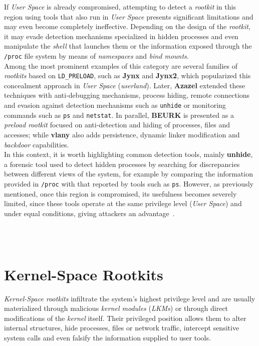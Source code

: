 If \textit{User Space} is already compromised, attempting to detect a \textit{rootkit} in this region using tools that also run in \textit{User Space} presents significant limitations and may even become completely ineffective.
Depending on the design of the \textit{rootkit}, it may evade detection mechanisms specialized in hidden processes and even manipulate the \textit{shell} that launches them or the information exposed through the \texttt{/proc} file system by means of \textit{namespaces} and \textit{bind mounts}.\\

Among the most prominent examples of this category are several families of \textit{rootkits} based on \texttt{LD\_PRELOAD},
such as \textbf{Jynx} and \textbf{Jynx2}, which popularized this concealment approach in \textit{User Space} (\textit{userland}).
Later, \textbf{Azazel} extended these techniques with anti-debugging mechanisms, process hiding, remote connections and evasion against detection mechanisms such as \texttt{unhide} or monitoring commands such as \texttt{ps} and \texttt{netstat}.
In parallel, \textbf{BEURK} is presented as a \textit{preload rootkit} focused on anti-detection and hiding of processes, files and accesses;
while \textbf{vlany} also adds persistence, dynamic linker modification and \textit{backdoor} capabilities.\\

In this context, it is worth highlighting common detection tools,
mainly \textbf{unhide}, a forensic tool used to detect hidden processes by searching for discrepancies between different views of the system,
for example by comparing the information provided in \texttt{/proc} with that reported by tools such as \texttt{ps}.
However, as previously mentioned, once this region is compromised, its usefulness becomes severely limited, since these tools operate at the same privilege level (\textit{User Space}) and under equal conditions, giving attackers an advantage~\cite{unhide_man}.\\

\

\

\section{Kernel-Space Rootkits}
\label{sec:kernel_rootkits}

\textit{Kernel-Space rootkits} infiltrate the system's highest privilege level and are usually materialized through malicious \textit{kernel modules} (\textit{LKMs}) or through direct modifications of the \textit{kernel} itself.
Their privileged position allows them to alter internal structures, hide processes, files or network traffic, intercept sensitive system calls and even falsify the information supplied to user tools.\\

